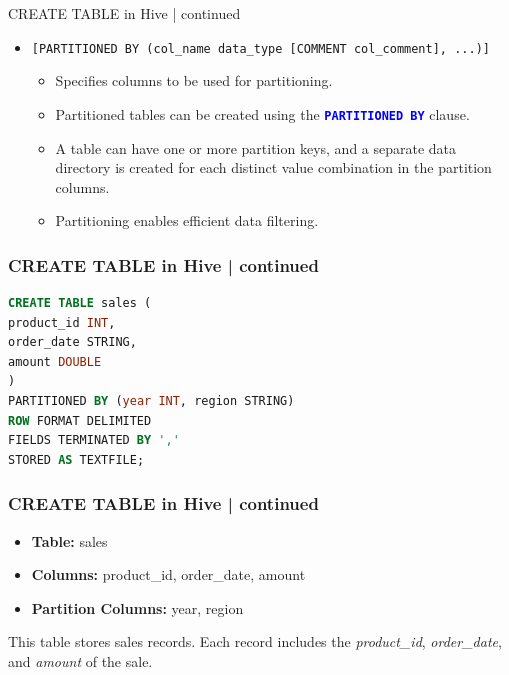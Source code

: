   \begin{frame}{CREATE TABLE in Hive | continued}
	\begin{tcolorbox}[colback=white,colframe=black,title= Part 8: Table Partitions]
		\small
	\begin{itemize}
	  \item \texttt{[PARTITIONED BY (col\_name data\_type [COMMENT col\_comment], ...)]}
	  \begin{itemize}
		\item Specifies columns to be used for partitioning.
		\vspace{-0.2cm}\item Partitioned tables can be created using the \textcolor{blue}{\textbf{\texttt{PARTITIONED BY}}} clause.
		\vspace{-0.2cm}\item A table can have one or more partition keys, and a separate data directory is created for each distinct value combination in the partition columns.
		\vspace{-0.2cm}\item Partitioning enables efficient data filtering.
		
	  \end{itemize}
	\end{itemize}
	\end{tcolorbox}
  \end{frame}
  \begin{frame}[fragile]
	\frametitle{CREATE TABLE in Hive | continued}
	\begin{tcolorbox}[colback=white,colframe=black,title= Part 8: Table Partitions]
		\small
\begin{lstlisting}[caption={Create Partitioned Table},language=SQL]
CREATE TABLE sales (
product_id INT,
order_date STRING,
amount DOUBLE
)
PARTITIONED BY (year INT, region STRING)
ROW FORMAT DELIMITED
FIELDS TERMINATED BY ','
STORED AS TEXTFILE;
\end{lstlisting}
\end{tcolorbox}

\end{frame}
	\begin{frame}[fragile]
	\frametitle{CREATE TABLE in Hive | continued}
	\begin{tcolorbox}[colback=white,colframe=black,title= Part 8: Table Partitions]
		\small

	\begin{itemize}
	\item \textbf{Table:} sales
	\item \textbf{Columns:} product_id, order_date, amount
	\item \textbf{Partition Columns:} year, region
	\end{itemize}
	This table stores sales records. Each record includes the \textit{product\_id}, \textit{order\_date}, and \textit{amount} of the sale.
\end{tcolorbox}
	
\end{frame}
